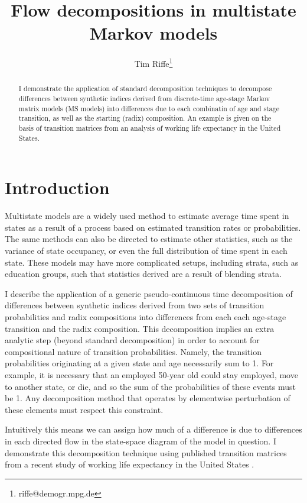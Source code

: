 \documentclass[12pt]{article}
\begin{document}
\title{Flow decompositions in multistate Markov models}
\author[1]{Tim Riffe\thanks{riffe@demogr.mpg.de}}
\maketitle

\begin{abstract}
I demonstrate the application of standard decomposition techniques to decompose differences between synthetic indices derived from discrete-time age-stage Markov matrix models (MS models) into differences due to each combinatin of age and stage transition, as well as the starting (radix) composition. An example is given on the basis of transition matrices from an analysis of working life expectancy in the United States.
\end{abstract}

\doublespacing
\section{Introduction}
Multistate models are a widely used method to estimate average time spent in states as a result of a process based on estimated transition rates or probabilities. The same methods can also be directed to estimate other statistics, such as the variance of state occupancy, or even the full distribution of time spent in each state. These models may have more complicated setups, including strata, such as education groups, such that statistics derived are a result of blending strata.

I describe the application of a generic pseudo-continuous time decomposition \citep{horiuchi2008} of differences between synthetic indices derived from two sets of transition probabilities and radix compositions into differences from each each age-stage transition and the radix composition. This decomposition implies an extra analytic step (beyond standard decomposition) in order to account for compositional nature of transition probabilities. Namely, the transition probabilities originating at a
given state and age necessarily sum to 1. For example, it is necessary that an employed 50-year old could stay employed, move to another state, or die, and so the sum of the probabilities of these events must be 1. Any decomposition method that operates by elementwise perturbation of these elements must respect this constraint.

 Intuitively this means we can assign how much of a difference is due to differences in each directed flow in the state-space diagram of the model in question. I demonstrate this decomposition technique using published transition matrices from a recent study of working life expectancy in the United States \citep{Dudel2017}.
\end{document}
